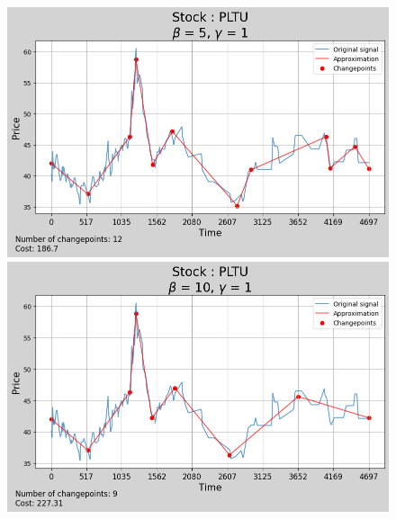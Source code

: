 \documentclass[11pt]{article}
\begin{document}
\begin{figure}
    \begin{minipage}[t]{0.42\textwidth}
        \includegraphics[width=\textwidth]{figures/results/beta_analysis_scale_1_stock_PLTU/beta_5.png}
    \end{minipage}
    \begin{minipage}[t]{0.42\textwidth}
        \includegraphics[width=\textwidth]{figures/results/beta_analysis_scale_1_stock_PLTU/beta_10.png}
    \end{minipage}


\end{figure}
\end{document}
